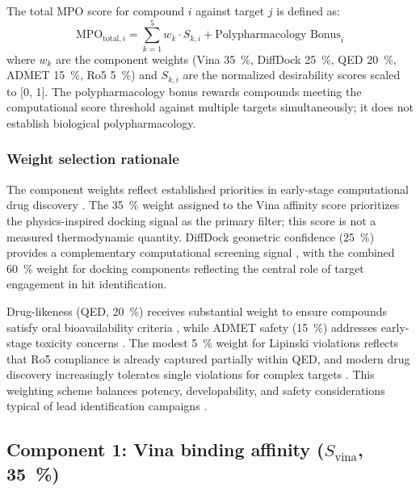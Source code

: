 \documentclass[journal=jcisd8,manuscript=suppinfo]{achemso}
\begin{document}
The total MPO score for compound $i$ against target $j$ is defined as:
\begin{equation}
\text{MPO}_{\text{total}, i} = \sum_{k=1}^{5} w_k \cdot S_{k,i} + \text{Polypharmacology Bonus}_i
\label{eq:mpo_total}
\end{equation}
where $w_k$ are the component weights (Vina \qty{35}{\percent}, DiffDock \qty{25}{\percent}, QED \qty{20}{\percent}, ADMET \qty{15}{\percent}, Ro5 \qty{5}{\percent}) and $S_{k,i}$ are the normalized desirability scores scaled to [\num{0}, \num{1}]. The polypharmacology bonus rewards compounds meeting the computational score threshold against multiple targets simultaneously; it does not establish biological polypharmacology.

\subsubsection*{Weight selection rationale}

The component weights reflect established priorities in early-stage computational drug discovery \cite{Hughes2008, Gleeson2008}. The \qty{35}{\percent} weight assigned to the Vina affinity score prioritizes the physics-inspired docking signal as the primary filter; this score is not a measured thermodynamic quantity. DiffDock geometric confidence (\qty{25}{\percent}) provides a complementary computational screening signal \cite{Corso2023}, with the combined \qty{60}{\percent} weight for docking components reflecting the central role of target engagement in hit identification.

Drug-likeness (QED, \qty{20}{\percent}) receives substantial weight to ensure compounds satisfy oral bioavailability criteria \cite{Lipinski2004}, while ADMET safety (\qty{15}{\percent}) addresses early-stage toxicity concerns \cite{Swanson2024}. The modest \qty{5}{\percent} weight for Lipinski violations reflects that Ro5 compliance is already captured partially within QED, and modern drug discovery increasingly tolerates single violations for complex targets \cite{Hughes2008}. This weighting scheme balances potency, developability, and safety considerations typical of lead identification campaigns \cite{Gleeson2008}.

\subsection*{Component 1: Vina binding affinity ($S_{\text{vina}}$, \qty{35}{\percent})}
\end{document}
